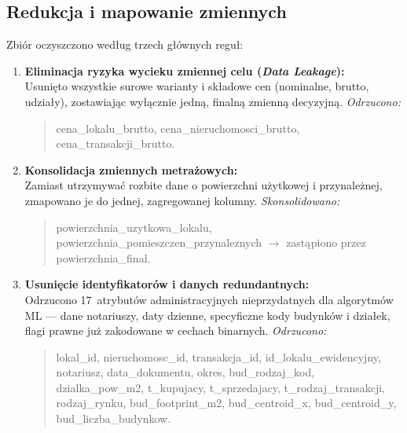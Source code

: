 \documentclass[12pt,a4paper]{article}
\begin{document}
\subsection{Redukcja i mapowanie zmiennych}

Zbiór oczyszczono według trzech głównych reguł:

\begin{enumerate}
  \item \textbf{Eliminacja ryzyka wycieku zmiennej celu (\textit{Data Leakage}):}\\
        Usunięto wszystkie surowe warianty i składowe cen (nominalne, brutto, udziały), zostawiając wyłącznie jedną, finalną zmienną decyzyjną.
        \smallskip
        \textit{Odrzucono:}
        \begin{quote}\small\ttfamily\sloppy
        cena\_lokalu\_brutto,
        cena\_nieruchomosci\_brutto,
        cena\_transakcji\_brutto.
        \end{quote}

  \item \textbf{Konsolidacja zmiennych metrażowych:}\\
        Zamiast utrzymywać rozbite dane o powierzchni użytkowej i przynależnej, zmapowano je do jednej, zagregowanej kolumny.
        \smallskip
        \textit{Skonsolidowano:}
        \begin{quote}\small\ttfamily\sloppy
        powierzchnia\_uzytkowa\_lokalu,
        powierzchnia\_pomieszczen\_przynaleznych
        $\rightarrow$ zastąpiono przez powierzchnia\_final.
        \end{quote}

  \item \textbf{Usunięcie identyfikatorów i danych redundantnych:}\\
        Odrzucono 17~atrybutów administracyjnych nieprzydatnych dla algorytmów ML --- dane notariuszy, daty dzienne, specyficzne kody budynków i działek, flagi prawne już zakodowane w cechach binarnych.
        \smallskip
        \textit{Odrzucono:}
        \begin{quote}\small\ttfamily\sloppy
        lokal\_id,
        nieruchomosc\_id,
        transakcja\_id,
        id\_lokalu\_ewidencyjny,
        notariusz,
        data\_dokumentu,
        okres,
        bud\_rodzaj\_kod,
        dzialka\_pow\_m2,
        t\_kupujacy,
        t\_sprzedajacy,
        t\_rodzaj\_transakcji,
        rodzaj\_rynku,
        bud\_footprint\_m2,
        bud\_centroid\_x,
        bud\_centroid\_y,
        bud\_liczba\_budynkow.
        \end{quote}
\end{enumerate}
\end{document}
